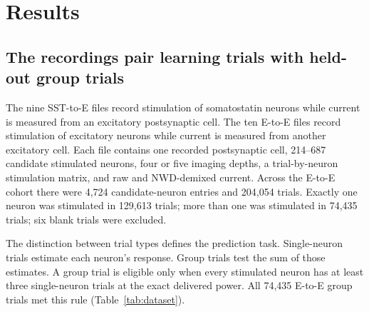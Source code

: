 \documentclass[10pt,twocolumn]{article}
\begin{document}
\section{Results}

\subsection{The recordings pair learning trials with held-out group trials}

The nine SST-to-E files record stimulation of somatostatin neurons while
current is measured from an excitatory postsynaptic cell. The ten E-to-E
files record stimulation of excitatory neurons while current is measured from
another excitatory cell. Each file contains one recorded postsynaptic cell,
214--687 candidate stimulated neurons, four or five imaging depths, a
trial-by-neuron stimulation matrix, and raw and NWD-demixed current. Across
the E-to-E cohort there were 4,724 candidate-neuron entries and 204,054
trials. Exactly one neuron was stimulated in 129,613 trials; more than one
was stimulated in 74,435 trials; six blank trials were excluded.

The distinction between trial types defines the prediction task.
Single-neuron trials estimate each neuron's response. Group trials test the
sum of those estimates. A group trial is eligible only when every stimulated
neuron has at least three single-neuron trials at the exact delivered power.
All 74,435 E-to-E group trials met this rule (Table~\ref{tab:dataset}).
\end{document}
